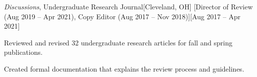 \begin{ritemize}
{\textit{Discussions}, Undergraduate Research Journal}[Cleveland, OH]
[Director of Review (Aug 2019 -- Apr 2021), Copy Editor (Aug 2017 -- Nov 2018)][Aug 2017 -- Apr 2021]
	\item Reviewed and revised 32 undergraduate research articles for fall and spring publications.
	\item Created formal documentation that explains the review process and guidelines.
\end{ritemize}
